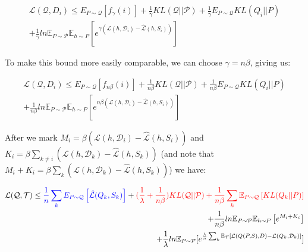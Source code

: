 \documentclass[letterpaper]{article}
\theoremstyle{definition}
\begin{document}
\begin{equation*}
\begin{split}
\mathcal{L}(\mathcal{Q}, D_i)\leq E_{P\sim \mathcal{Q}} \left [ f_{\gamma}(i)\right ] +  \frac{1}{\gamma}KL(\mathcal{Q}||\mathcal{P}) +\frac{1}{\gamma}E_{P\sim \mathcal{Q}}KL(Q_i||P) \\  + \frac{1}{\gamma}ln\mathbb{E}_{P\sim \mathcal{P}}\mathbb{E}_{h\sim P}\left [ e^{\gamma(\mathcal{L}(h,\mathcal{D}_i)- \hat{\mathcal{L}}(h, S_i))} \right ]
\end{split}
\end{equation*}

To make this bound more easily comparable, we can choose $\gamma=n\beta$,  giving us:


\begin{equation*}
\begin{split}
\mathcal{L}(\mathcal{Q}, D_i)\leq E_{P\sim \mathcal{Q}} \left [ f_{n\beta}(i) \right ] + \frac{1}{n\beta} KL(\mathcal{Q}||\mathcal{P}) +\frac{1}{n\beta} E_{P\sim \mathcal{Q}}KL(Q_i||P) \\  + \frac{1}{n\beta} ln\mathbb{E}_{P\sim \mathcal{P}}\mathbb{E}_{h\sim P}\left [ e^{n\beta(\mathcal{L}(h,\mathcal{D}_i)- \hat{\mathcal{L}}(h, S_i))} \right ]
\end{split}
\end{equation*}

After we mark $M_i=\beta(\mathcal{L}(h,\mathcal{D}_i)- \hat{\mathcal{L}}(h, S_i))$ and $K_i=\beta\sum_{k\neq i}(\mathcal{L}(h,\mathcal{D}_k)- \hat{\mathcal{L}}(h, S_k))$ (and note that $M_i+K_i=\beta\sum_{k}(\mathcal{L}(h,\mathcal{D}_k)- \hat{\mathcal{L}}(h, S_k))$) we have:

\begin{equation*}
\begin{split}
\mathcal{L}(\mathcal{Q}, \mathcal{T}) \leq \textcolor{blue}{\frac{1}{n}\sum_k E_{P\sim \mathcal{Q}} \left [ \hat{\mathcal{L}}(Q_k,S_k) \right ]} + \textcolor{red}{(\frac{1}{\lambda}+ \frac{1}{n\beta}) KL(\mathcal{Q}||\mathcal{P}) + \frac{1}{n\beta}\sum_k \mathbb{E}_{P\sim \mathcal{Q}} \left [KL(Q_k||P) \right ]}\\ 
+ \frac{1}{n\beta} ln\mathbb{E}_{P\sim \mathcal{P}}\mathbb{E}_{h\sim P}\left [ e^{M_i+K_i} \right ]
 \\+\frac{1}{\lambda}ln \mathbb{E}_{P\sim \mathcal{P}} [e^{\frac{\lambda}{n}\sum_{k}\mathbb{E}_{\mathcal{T}}[\mathcal{L}(Q(P,S),D)- \mathcal{L}(Q_k, \mathcal{D}_k)]}]
\end{split}
\end{equation*}
\end{document}
